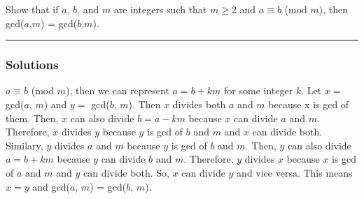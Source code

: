 \newpage
\begin{question}
Show that if $a$, $b$, and $m$ are integers such that $m \geq 2$ and
$a \equiv b$ (mod $m$), then gcd($a$,$m$) = gcd($b$,$m$).
\end{question}

\par\noindent\rule{\textwidth}{0.5pt}

\subsubsection*{Solutions}
\indent\indent
$a \equiv b$ (mod $m$), then we can represent $a = b + km$ for some integer $k$. Let $x = $ gcd($a$, $m$) and $y = $ gcd($b$, $m$). Then $x$ divides both $a$ and $m$ because x is gcd of them. Then, $x$ can also divide $b = a - km$ because $x$ can divide $a$ and $m$. Therefore, $x$ divides $y$ because $y$ is gcd of $b$ and $m$ and $x$ can divide both. Similary, $y$ divides $a$ and $m$ because $y$ is gcd of $b$ and $m$. Then, $y$ can also divide $a = b + km$ because $y$ can divide $b$ and $m$. Therefore, $y$ divides $x$ because $x$ is gcd of $a$ and $m$ and $y$ can divide both. So, $x$ can divide $y$ and vice versa. This means $x = y$ and gcd($a$, $m$) = gcd($b$, $m$).
